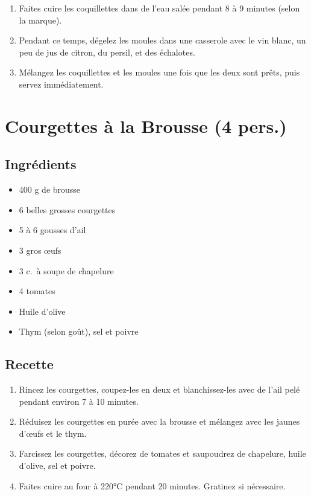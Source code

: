 \begin{enumerate}
\def\labelenumi{\arabic{enumi}.}

\item
  Faites cuire les coquillettes dans de l'eau salée pendant 8 à 9
  minutes (selon la marque).
\item
  Pendant ce temps, dégelez les moules dans une casserole avec le vin
  blanc, un peu de jus de citron, du persil, et des échalotes.
\item
  Mélangez les coquillettes et les moules une fois que les deux sont
  prêts, puis servez immédiatement.
\end{enumerate}

\section{Courgettes à la Brousse (4
pers.)}\label{courgettes-uxe0-la-brousse-4-pers.}

\subsection{Ingrédients}\label{ingruxe9dients-3}

\begin{itemize}

\item
  400 g de brousse
\item
  6 belles grosses courgettes
\item
  5 à 6 gousses d'ail
\item
  3 gros œufs
\item
  3 c.~à soupe de chapelure
\item
  4 tomates
\item
  Huile d'olive
\item
  Thym (selon goût), sel et poivre
\end{itemize}

\subsection{Recette}\label{recette-3}

\begin{enumerate}
\def\labelenumi{\arabic{enumi}.}

\item
  Rincez les courgettes, coupez-les en deux et blanchissez-les avec de
  l'ail pelé pendant environ 7 à 10 minutes.
\item
  Réduisez les courgettes en purée avec la brousse et mélangez avec les
  jaunes d'œufs et le thym.
\item
  Farcissez les courgettes, décorez de tomates et saupoudrez de
  chapelure, huile d'olive, sel et poivre.
\item
  Faites cuire au four à 220°C pendant 20 minutes. Gratinez si
  nécessaire.
\end{enumerate}

